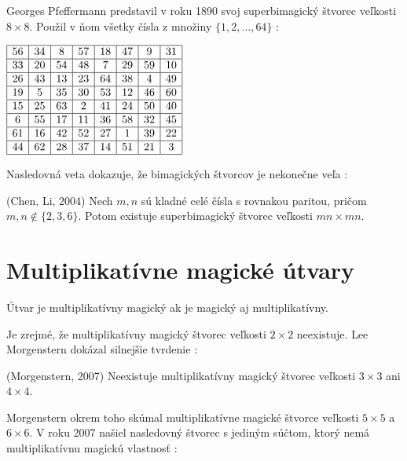 Georges Pfeffermann predstavil v roku 1890 svoj superbimagický štvorec veľkosti $8 \times 8$. Použil v ňom všetky čísla z množiny $\{1, 2, \dots , 64\}$ \cite{multimagie}:

\begin{center}
$\begin{array}{ |c|c|c|c|c|c|c|c| }
\hline
56 & 34 & 8 & 57 & 18 & 47 & 9 & 31 \\ 
\hline
33 & 20 & 54 & 48 & 7 & 29 & 59 & 10 \\ 
\hline
26 & 43 & 13 & 23 & 64 & 38 & 4 & 49 \\ 
\hline
19 & 5 & 35 & 30 & 53 & 12 & 46 & 60 \\ 
\hline
15 & 25 & 63 & 2 & 41 & 24 & 50 & 40 \\ 
\hline
6 & 55 & 17 & 11 & 36 & 58 & 32 & 45 \\ 
\hline
61 & 16 & 42 & 52 & 27 & 1 & 39 & 22 \\ 
\hline
44 & 62 & 28 & 37 & 14 & 51 & 21 & 3 \\ 
\hline
\end{array}$
\end{center}

Nasledovná veta dokazuje, že bimagických štvorcov je nekonečne veľa \cite{bimagic}:

\begin{theorem} (Chen, Li, 2004) Nech $m,n$ sú kladné celé čísla s rovnakou paritou, pričom $m,n \notin \{2,3,6\}$. Potom existuje superbimagický štvorec veľkosti $mn \times mn$.
\end{theorem}

\section{Multiplikatívne magické útvary}
\begin{definition} Útvar je multiplikatívny magický ak je magický aj multiplikatívny.
\end{definition}

Je zrejmé, že multiplikatívny magický štvorec veľkosti $2 \times 2$ neexistuje. Lee Morgenstern dokázal silnejšie tvrdenie \cite{multimagie}:

\begin{theorem} (Morgenstern, 2007) Neexistuje multiplikatívny magický štvorec veľkosti $3 \times 3$ ani $4 \times 4$.
\end{theorem}

Morgenstern okrem toho skúmal multiplikatívne magické štvorce veľkosti $5 \times 5$ a $6 \times 6$. V roku 2007 našiel nasledovný štvorec s jediným súčtom, ktorý nemá multiplikatívnu magickú vlastnosť \cite{multimagie}:

